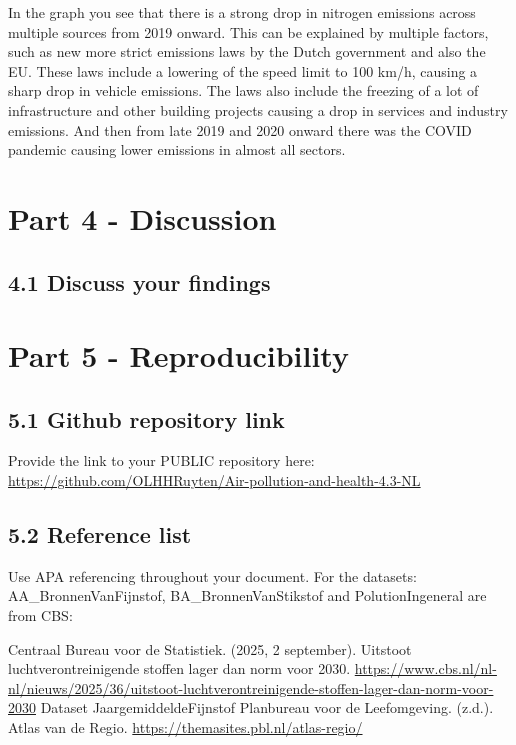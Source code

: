 \documentclass[
]{article}
\begin{document}
In the graph you see that there is a strong drop in nitrogen emissions
across multiple sources from 2019 onward. This can be explained by
multiple factors, such as new more strict emissions laws by the Dutch
government and also the EU. These laws include a lowering of the speed
limit to 100 km/h, causing a sharp drop in vehicle emissions. The laws
also include the freezing of a lot of infrastructure and other building
projects causing a drop in services and industry emissions. And then
from late 2019 and 2020 onward there was the COVID pandemic causing
lower emissions in almost all sectors.

\section{Part 4 - Discussion}\label{part-4---discussion}

\subsection{4.1 Discuss your findings}\label{discuss-your-findings}

\section{Part 5 - Reproducibility}\label{part-5---reproducibility}

\subsection{5.1 Github repository link}\label{github-repository-link}

Provide the link to your PUBLIC repository here:
\url{https://github.com/OLHHRuyten/Air-pollution-and-health-4.3-NL}

\subsection{5.2 Reference list}\label{reference-list}

Use APA referencing throughout your document. For the datasets:
AA\_BronnenVanFijnstof, BA\_BronnenVanStikstof and PolutionIngeneral are
from CBS:

Centraal Bureau voor de Statistiek. (2025, 2 september). Uitstoot
luchtverontreinigende stoffen lager dan norm voor 2030.
\url{https://www.cbs.nl/nl-nl/nieuws/2025/36/uitstoot-luchtverontreinigende-stoffen-lager-dan-norm-voor-2030}
Dataset JaargemiddeldeFijnstof Planbureau voor de Leefomgeving. (z.d.).
Atlas van de Regio. \url{https://themasites.pbl.nl/atlas-regio/}
\end{document}
